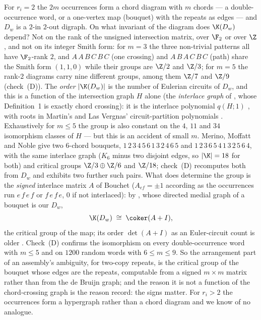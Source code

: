 \begin{remark}\label{Bio3:rem:chord}
For $r_i=2$ the $2m$ occurrences form a chord diagram with $m$ chords --- a
double-occurrence word, or a one-vertex map (bouquet) with the repeats as edges --- and
$D_w$ is a $2$-in $2$-out digraph. On what invariant of the diagram does $\K(D_w)$
depend? Not on the rank of the unsigned intersection matrix, over $\F_2$ or over $\Z$,
and not on its integer Smith form: for $m=3$ the three non-trivial patterns all have
$\F_2$-rank $2$, and $A\,A\,B\,C\,B\,C$ (one crossing) and $A\,B\,A\,C\,B\,C$ (path)
share the Smith form $(1,1,0)$ while their groups are $\Z/2$ and $\Z/3$; for $m=5$ the
rank-$2$ diagrams carry nine different groups, among them $\Z/7$ and $\Z/9$
(check~(D)). The \emph{order} $|\K(D_w)|$ is the number of Eulerian circuits of $D_w$,
and this is a function of the intersection graph $H$ alone (the \emph{interlace graph}
of \cite{ABS}, whose Definition~1 is exactly chord crossing): it is the interlace
polynomial $q(H;1)$ \cite[Thm.~9, Cor.~13]{ABS}, with roots in Martin's and Las Vergnas'
circuit-partition polynomials \cite{LasVergnas}. Exhaustively for $m\le5$ the group is
also constant on the $4$, $11$ and $34$ isomorphism classes of $H$ --- but this is an
accident of small $m$. Merino, Moffatt and Noble \cite[Rem.~6.7]{MMN} give two
$6$-chord bouquets, $1\,2\,3\,4\,5\,6\,1\,3\,2\,4\,6\,5$ and
$1\,2\,3\,6\,5\,4\,1\,3\,2\,5\,6\,4$, with the same interlace graph ($K_6$ minus two
disjoint edges, so $|\K|=18$ for both) and critical groups $\Z/3\oplus\Z/6$ and
$\Z/18$; check~(D) recomputes both from $D_w$ and exhibits two further such pairs. What
does determine the group is the \emph{signed} interlace matrix $A$ of Bouchet
($A_{ef}=\pm1$ according as the occurrences run $e\,f\,e\,f$ or $f\,e\,f\,e$, $0$ if
not interlaced): by \cite[Thm.~7.3]{MMN}, whose directed medial graph of a bouquet is
our $D_w$,
\[
\K(D_w)\;\cong\;\coker(A+I),
\]
the critical group of the map; its order $\det(A+I)$ as an Euler-circuit count is older
\cite{MacrisPule,Jonsson}. Check~(D) confirms the isomorphism on every double-occurrence
word with $m\le5$ and on $1200$ random words with $6\le m\le9$. So the arrangement part
of an assembly's ambiguity, for two-copy repeats, is the critical group of the bouquet
whose edges are the repeats, computable from a signed $m\times m$ matrix rather than
from the de Bruijn graph; and the reason it is not a function of the chord-crossing
graph is the reason \cite{MMN} record: the signs matter. For $r_i>2$ the occurrences
form a hypergraph rather than a chord diagram and we know of no analogue.
\end{remark}

